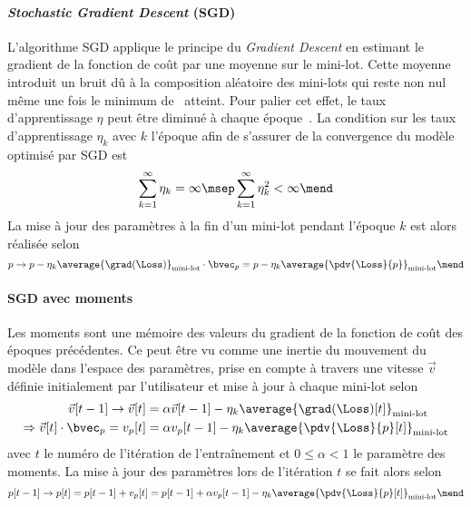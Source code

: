 \paragraph{\emph{Stochastic Gradient Descent} (SGD)} \cite{SGD}
L'algorithme SGD applique le principe du \emph{Gradient Descent} en estimant le gradient de la fonction de coût par une moyenne sur le mini-lot.
Cette moyenne introduit un bruit dû à la composition aléatoire des mini-lots
qui reste non nul même une fois le minimum de \Loss\ atteint.
Pour palier cet effet, le taux d'apprentissage $\eta$ peut être diminué à chaque époque~\cite{DNN}.
La condition sur les taux d'apprentissage $\eta_k$ avec $k$ l'époque afin de s'assurer de la convergence du modèle optimisé par SGD est
\begin{equation}
\sum_{k=1}^\infty \eta_k = \infty
\msep
\sum_{k=1}^\infty \eta_k^2 < \infty
\mend
\end{equation}
La mise à jour des paramètres à la fin d'un mini-lot pendant l'époque $k$ est alors réalisée selon
\begin{equation}
p \to p - \eta_k \average{\grad(\Loss)}_\text{mini-lot} \cdot \bvec_p = p - \eta_k \average{\pdv{\Loss}{p}}_\text{mini-lot}
\mend
\end{equation}
\paragraph{SGD avec moments} \cite{DNN}
Les moments sont une \og mémoire \fg{} des valeurs du gradient de la fonction de coût des époques précédentes.
Ce peut être vu comme une inertie du mouvement du modèle dans l'espace des paramètres,
prise en compte à travers une vitesse $\vec{v}$ définie initialement par l'utilisateur et mise à jour à chaque mini-lot selon
\begin{align}
\vec{v}[t-1] \to \vec{v}[t]
&=
\alpha\vec{v}[t-1] - \eta_k \average{\grad(\Loss)[t]}_\text{mini-lot}
\\
\Rightarrow
\vec{v}[t]\cdot\bvec_p = v_p[t]
&=
\alpha v_p[t-1] - \eta_k \average{\pdv{\Loss}{p} [t]}_\text{mini-lot}
\end{align}
avec
$t$ le numéro de l'itération de l'entraînement
et
$0\leq\alpha<1$ le paramètre des moments.
La mise à jour des paramètres lors de l'itération $t$ se fait alors selon
\begin{equation}
p [t-1] \to p[t]
=
p[t-1] + v_p[t]
=
p[t-1] + \alpha v_p[t-1] - \eta_k \average{\pdv{\Loss}{p} [t]}_\text{mini-lot}
\mend
\end{equation}
